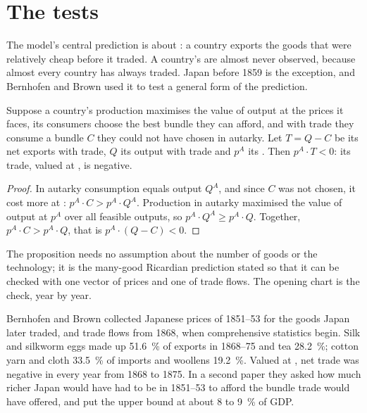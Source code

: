 \section{The tests}\label{sec:b3:ricardian-trade:tests}

The model's central prediction is about : a country exports the
goods that were relatively cheap before it traded. A country's 
are almost never observed, because almost every country has always traded.
Japan before 1859 is the exception, and Bernhofen and Brown used it to test a
general form of the prediction.

\begin{proposition}\label{prop:b3:ricardian-trade:law}
Suppose a country's production maximises the value of output at the prices it
faces, its consumers choose the best bundle they can afford, and with trade they
consume a bundle $C$ they could not have chosen in autarky. Let $T = Q - C$ be its
net exports with trade, $Q$ its output with trade and $p^A$ its .
Then $p^A \cdot T < 0$: its trade, valued at , is negative.
\end{proposition}

\begin{proof}
In autarky consumption equals output $Q^A$, and since $C$ was not chosen, it
cost more at : $p^A \cdot C > p^A \cdot Q^A$. Production in autarky
maximised the value of output at $p^A$ over all feasible outputs, so $p^A \cdot Q^A
\ge p^A \cdot Q$. Together, $p^A \cdot C > p^A \cdot Q$, that is $p^A \cdot (Q - C) < 0$.
\end{proof}

The proposition needs no assumption about the number of goods or the
technology; it is the many-good Ricardian prediction stated so that it can be
checked with one vector of prices and one of trade flows. The opening chart is
the check, year by year.

\begin{record}
Bernhofen and Brown collected Japanese prices of 1851--53 for the goods Japan
later traded, and trade flows from 1868, when comprehensive statistics begin.
Silk and silkworm eggs made up 51.6~\% of exports in 1868--75 and tea 28.2~\%;
cotton yarn and cloth 33.5~\% of imports and woollens 19.2~\%. %
Valued at , net trade was negative in every year from 1868 to 1875.
In a second paper they asked how much richer Japan would have had to be in
1851--53 to afford the bundle trade would have offered, and put the upper bound
at about 8 to 9~\% of GDP. %
\end{record}


